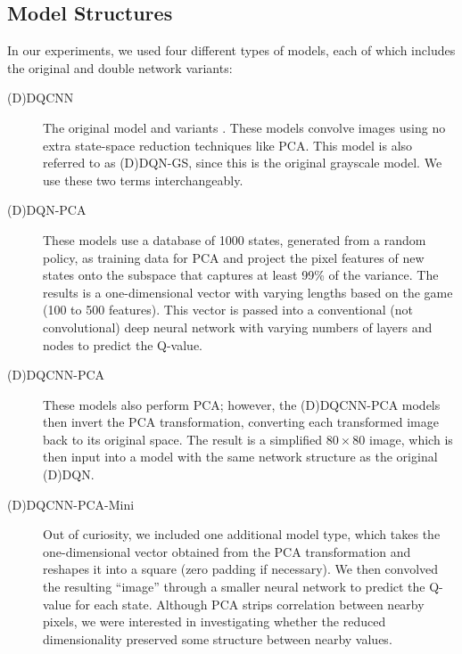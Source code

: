 \documentclass[11pt]{article}
\begin{document}
\subsection{Model Structures}
\label{subsec:model_structure}

In our experiments, we used four different types of models, each of which includes the original and double network variants: 

\begin{description}
    \item[(D)DQCNN] The original model \cite{mnih2013playing, mnih2015human} and variants \cite{van2016deep}. These models convolve images using no extra state-space reduction techniques like PCA. This model is also referred to as (D)DQN-GS, since this is the original grayscale model. We use these two terms interchangeably.
    
    \item[(D)DQN-PCA] These models use a database of 1000 states, generated from a random policy, as training data for PCA and project the pixel features of new states onto the subspace that captures at least 99\% of the variance. The results is a one-dimensional vector with varying lengths based on the game (100 to 500 features). This vector is passed into a conventional (not convolutional) deep neural network with varying numbers of layers and nodes to predict the Q-value.
    
    \item[(D)DQCNN-PCA] These models also perform PCA; however, the (D)DQCNN-PCA models then invert the PCA transformation, converting each transformed image back to its original space. The result is a simplified $80 \times 80$ image, which is then input into a model with the same network structure as the original (D)DQN.
    
    \item[(D)DQCNN-PCA-Mini] Out of curiosity, we included one additional model type, which takes the one-dimensional vector obtained from the PCA transformation and reshapes it into a square (zero padding if necessary). We then convolved the resulting ``image'' through a smaller neural network to predict the Q-value for each state. Although PCA strips correlation between nearby pixels, we were interested in investigating whether the reduced dimensionality preserved some structure between nearby values.
\end{description}
\end{document}

